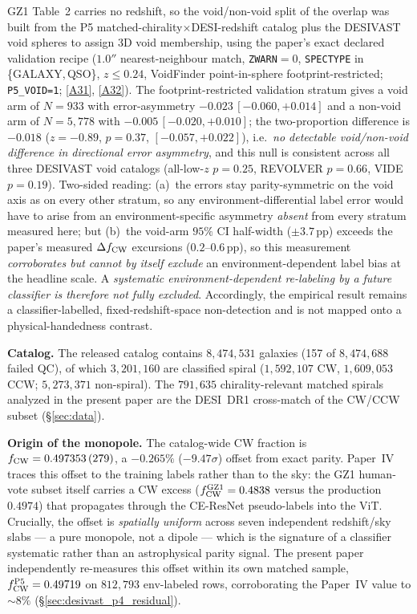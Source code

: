 \documentclass[aps,prd,twocolumn,superscriptaddress,showpacs,preprintnumbers,nofootinbib,longbibliography,floatfix]{revtex4-2}
\newcommand{\repoBase}{https://github.com/Hubify-Projects/bigbounce/blob/main}
\begin{document}
GZ1 Table~2 carries no redshift, so the void/non-void split of the overlap
was built from the P5 matched-chirality$\times$DESI-redshift catalog plus the
DESIVAST void spheres to assign 3D void membership, using the paper's exact
declared validation recipe ($1.0''$ nearest-neighbour match, \texttt{ZWARN}$=0$,
\texttt{SPECTYPE} in \{GALAXY,\,QSO\}, $z\le0.24$, VoidFinder point-in-sphere
footprint-restricted; \texttt{P5\_VOID=1};
\href{\repoBase/pipelines/p2\_chirality/outputs/gz1\_stratified\_confusion.json}{[A31]},
\href{\repoBase/pipelines/p2\_chirality/scripts/gz1\_stratified\_confusion.py}{[A32]}).
The footprint-restricted validation stratum gives a void arm of $N=933$ with
error-asymmetry $-0.023\,[-0.060,+0.014]$ and a non-void arm of $N=5{,}778$
with $-0.005\,[-0.020,+0.010]$; the two-proportion difference is $-0.018$
($z=-0.89$, $p=0.37$, $[-0.057,+0.022]$), i.e.\ \emph{no detectable
void/non-void difference in directional error asymmetry}, and this null is
consistent across all three DESIVAST void catalogs (all-low-$z$ $p=0.25$,
REVOLVER $p=0.66$, VIDE $p=0.19$). Two-sided reading: (a)~the errors stay
parity-symmetric on the void axis as on every other stratum, so any
environment-differential label error would have to arise from an
environment-specific asymmetry \emph{absent} from every stratum measured
here; but (b)~the void-arm $95\%$ CI half-width ($\pm3.7$\,pp) exceeds the
paper's measured $\Delta f_{\rm CW}$ excursions ($0.2$--$0.6$\,pp), so this measurement
\emph{corroborates but cannot by itself exclude} an environment-dependent
label bias at the headline scale. A \emph{systematic
environment-dependent re-labeling by a future classifier is therefore
not fully excluded}. Accordingly, the empirical result remains a
classifier-labelled, fixed-redshift-space non-detection and is not mapped
onto a physical-handedness contrast.

\textbf{Catalog.} The released catalog contains $8{,}474{,}531$
galaxies (157 of $8{,}474{,}688$ failed QC), of which $3{,}201{,}160$
are classified spiral ($1{,}592{,}107$ CW, $1{,}609{,}053$ CCW;
$5{,}273{,}371$ non-spiral). The $791{,}635$ chirality-relevant matched
spirals analyzed in the present paper are the DESI~DR1 cross-match of
the CW/CCW subset (\S\ref{sec:data}).

\textbf{Origin of the monopole.} The catalog-wide CW fraction is
$f_{\rm CW}=0.497353\,(279)$, a $-0.265\%$ ($-9.47\sigma$) offset from
exact parity. Paper~IV traces this offset to the training labels rather
than to the sky: the GZ1 human-vote subset itself carries a CW excess
($f_{\rm CW}^{\rm GZ1}=0.4838$ versus the production $0.4974$) that
propagates through the CE-ResNet pseudo-labels into the ViT. Crucially,
the offset is \emph{spatially uniform} across seven independent
redshift/sky slabs --- a pure monopole, not a dipole --- which is the
signature of a classifier systematic rather than an astrophysical parity
signal. The present paper independently re-measures this offset within
its own matched sample, $f_{\rm CW}^{\rm P5}=0.49719$ on $812{,}793$
env-labeled rows, corroborating the Paper~IV value to ${\sim}8\%$
(\S\ref{sec:desivast_p4_residual}).
\end{document}
